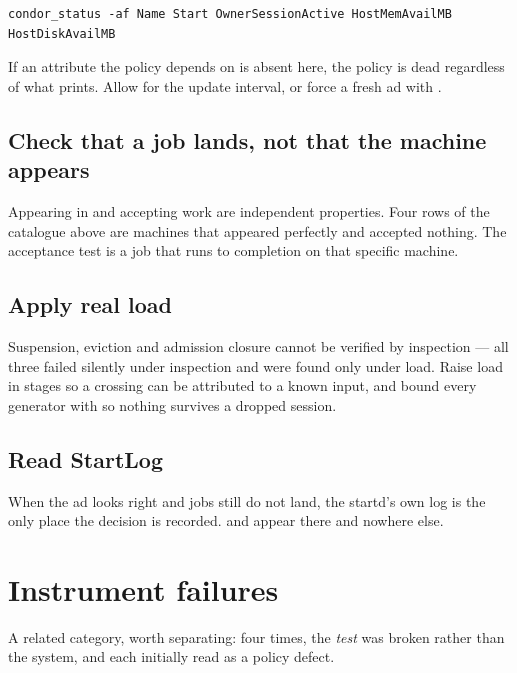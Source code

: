 \begin{lstlisting}[style=term]
condor_status -af Name Start OwnerSessionActive HostMemAvailMB HostDiskAvailMB
\end{lstlisting}

If an attribute the policy depends on is absent here, the policy is dead
regardless of what  prints. Allow for the update
interval, or force a fresh ad with .

\subsection{Check that a job lands, not that the machine appears}

Appearing in  and accepting work are independent properties.
Four rows of the catalogue above are machines that appeared perfectly and
accepted nothing. The acceptance test is a job that runs to completion on that
specific machine.

\subsection{Apply real load}

Suspension, eviction and admission closure cannot be verified by inspection ---
all three failed silently under inspection and were found only under load. Raise
load in stages so a crossing can be attributed to a known input, and bound every
generator with  so nothing survives a dropped session.

\subsection{Read StartLog}

When the ad looks right and jobs still do not land, the startd's own log is the
only place the decision is recorded.  and
 appear there and nowhere else.

\section{Instrument failures}
\label{sec:instruments}

A related category, worth separating: four times, the \emph{test} was broken
rather than the system, and each initially read as a policy defect.

